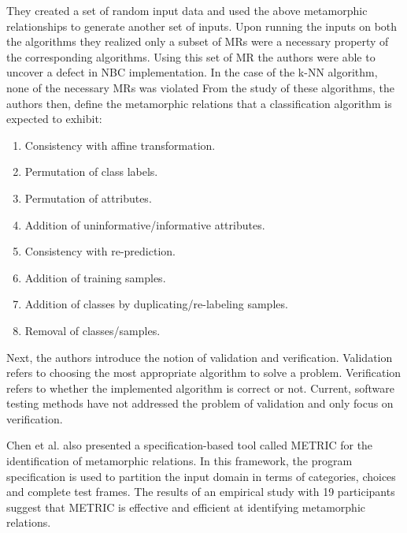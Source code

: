 They created a set of random input data and used the above metamorphic relationships to generate another set of inputs. Upon running the inputs on both the algorithms they realized only a subset of MRs were a necessary property of the corresponding algorithms. Using this set of MR the authors were able to uncover a defect in NBC implementation. In the case of the k-NN algorithm, none of the necessary MRs was violated
From the study of these algorithms, the authors then, define the metamorphic relations that a classification algorithm is expected to exhibit:
\begin{enumerate}
  \item Consistency with affine transformation.
  \item Permutation of class labels.
  \item Permutation of attributes.
  \item Addition of uninformative/informative attributes.
  \item Consistency with re-prediction.
  \item Addition of training samples.
  \item Addition of classes by duplicating/re-labeling samples.
  \item Removal of classes/samples.
\end{enumerate}
Next, the authors introduce the notion of validation and verification. Validation refers to choosing the most appropriate algorithm to solve a problem. Verification refers to whether the implemented algorithm is correct or not. Current, software testing methods have not addressed the problem of validation and only focus on verification.

Chen et al. \cite{Chen2016} also presented a specification-based tool called METRIC for the identification of metamorphic relations. In this framework, the program specification is used to partition the input domain in terms of categories, choices and complete test frames. The results of an empirical study with 19 participants suggest that METRIC is effective and efficient at identifying metamorphic relations.

